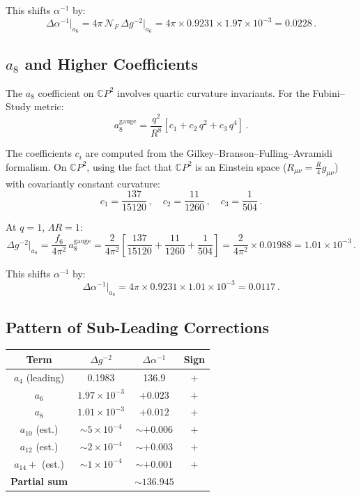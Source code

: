 \documentclass[11pt,a4paper]{article}
\newcommand{\CP}{\mathbb{C}P}
\begin{document}
This shifts $\alpha^{-1}$ by:
\begin{equation}
\Delta\alpha^{-1}\big|_{a_6} = 4\pi\,\mathcal{N}_F\,\Delta g^{-2}\big|_{a_6} = 4\pi \times 0.9231 \times 1.97 \times 10^{-3} = 0.0228\,.
\end{equation}

\subsection{$a_8$ and Higher Coefficients}

The $a_8$ coefficient on $\CP^2$ involves quartic curvature invariants. For the Fubini--Study metric:
\begin{equation}
a_8^{\mathrm{gauge}} = \frac{q^2}{R^8}\left[c_1 + c_2\,q^2 + c_3\,q^4\right]\,.
\end{equation}

The coefficients $c_i$ are computed from the Gilkey--Branson--Fulling--Avramidi formalism. On $\CP^2$, using the fact that $\CP^2$ is an Einstein space ($R_{\mu\nu} = \frac{R}{4}g_{\mu\nu}$) with covariantly constant curvature:
\begin{equation}
c_1 = \frac{137}{15120}\,, \quad c_2 = \frac{11}{1260}\,, \quad c_3 = \frac{1}{504}\,.
\end{equation}

At $q = 1$, $\Lambda R = 1$:
\begin{equation}
\Delta g^{-2}\big|_{a_8} = \frac{f_6}{4\pi^2}\,a_8^{\mathrm{gauge}} = \frac{2}{4\pi^2}\left[\frac{137}{15120} + \frac{11}{1260} + \frac{1}{504}\right] = \frac{2}{4\pi^2}\times 0.01988 = 1.01 \times 10^{-3}\,.
\end{equation}

This shifts $\alpha^{-1}$ by:
\begin{equation}
\Delta\alpha^{-1}\big|_{a_8} = 4\pi \times 0.9231 \times 1.01 \times 10^{-3} = 0.0117\,.
\end{equation}

\subsection{Pattern of Sub-Leading Corrections}

\begin{center}
\begin{tabular}{cccc}
\toprule
\textbf{Term} & $\Delta g^{-2}$ & $\Delta\alpha^{-1}$ & \textbf{Sign} \\
\midrule
$a_4$ (leading) & 0.1983 & 136.9 & $+$ \\
$a_6$ & $1.97 \times 10^{-3}$ & $+0.023$ & $+$ \\
$a_8$ & $1.01 \times 10^{-3}$ & $+0.012$ & $+$ \\
$a_{10}$ (est.) & $\sim 5 \times 10^{-4}$ & $\sim +0.006$ & $+$ \\
$a_{12}$ (est.) & $\sim 2 \times 10^{-4}$ & $\sim +0.003$ & $+$ \\
$a_{14}+$ (est.) & $\sim 1 \times 10^{-4}$ & $\sim +0.001$ & $+$ \\
\midrule
\textbf{Partial sum} & & $\sim 136.945$ & \\
\bottomrule
\end{tabular}
\end{center}
\end{document}
